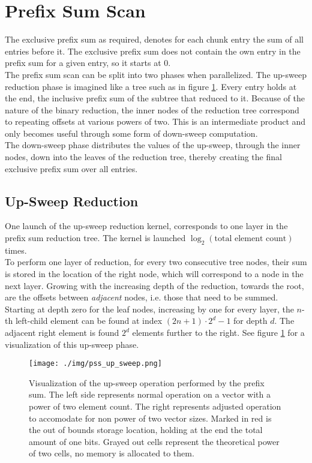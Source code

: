 \documentclass{tudscrreprt}
\begin{document}
		\section{Prefix Sum Scan}
			The exclusive prefix sum as required, denotes for each chunk entry the sum of all entries before it. The exclusive prefix sum does not contain the own entry in the prefix sum for a given entry, so it starts at 0. \\
			
			The prefix sum scan can be split into two phases when parallelized. The up-sweep reduction phase is imagined like a tree such as in figure \ref{fig:pss_up_sweep}. Every entry holds at the end, the inclusive prefix sum of the subtree that reduced to it. Because of the nature of the binary reduction, the inner nodes of the reduction tree correspond to repeating offsets at various powers of two. This is an intermediate product and only becomes useful through some form of down-sweep computation. \\
			The down-sweep phase distributes the values of the up-sweep, through the inner nodes, down into the leaves of the reduction tree, thereby creating the final exclusive prefix sum over all entries. \cite{cuda_gems3ppss} \\
		
			\subsection{Up-Sweep Reduction}
				One launch of the up-sweep reduction kernel, corresponds to one layer in the prefix sum reduction tree. The kernel is launched $\log_2(\text{total element count})$ times. \\
				To perform one layer of reduction, for every two consecutive tree nodes, their sum is stored in the location of the right node, which will correspond to a node in the next layer. Growing with the increasing depth of the reduction, towards the root, are the offsets between \emph{adjacent} nodes, i.e. those that need to be summed. Starting at depth zero for the leaf nodes, increasing by one for every layer, the $n$-th left-child element can be found at index $(2n+1) \cdot 2^d -1$ for depth $d$. The adjacent right element is found $2^d$ elements further to the right. See figure \ref{fig:pss_up_sweep} for a visualization of this up-sweep phase. \\
				\begin{figure}[!ht]
					\centering
					\texttt{[image: ./img/pss\_up\_sweep.png]}
					\caption{\label{fig:pss_up_sweep}Visualization of the up-sweep operation performed by the prefix sum. The left side represents normal operation on a vector with a power of two element count. The right represents adjusted operation to accomodate for non power of two vector sizes. Marked in red is the out of bounds storage location, holding at the end the total amount of one bits. Grayed out cells represent the theoretical power of two cells, no memory is allocated to them.}
				\end{figure}
				
\end{document}
